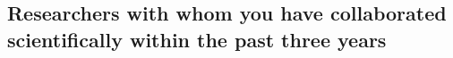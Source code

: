\documentclass{scrartcl}
\begin{document}
%
%
%

\subsection{Researchers with whom you have collaborated scientifically within the past three years}

\end{document}
